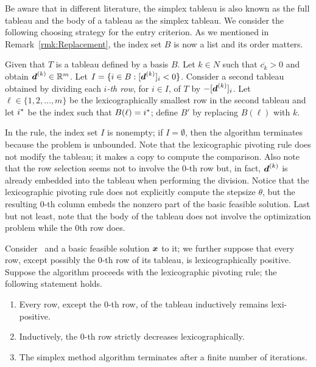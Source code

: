 Be aware that in different literature, the simplex tableau is also known as the full tableau and the body of a tableau as the simplex tableau. We consider the following choosing strategy for the entry criterion. As we mentioned in Remark~\ref{rmk:Replacement}, the index set $B$ is now a list and its order matters. 

\begin{definition}
Given that $T$ is a tableau defined by a basis $B$. Let $k\in N$ such that $\overline{c_k} > 0$ and obtain ${\boldsymbol d}^{(k)}\in\mathbb R^m$. Let $I = \{i\in B: [{\boldsymbol d}^{(k)}]_i < 0\}$. Consider a second tableau obtained by dividing each {\em $i$-th row}, for $i\in I$, of $T$ by $-[{\boldsymbol d}^{(k)}]_i$. Let $\ell \in \{1, 2, \dots, m\}$ be the lexicographically smallest row in the second tableau and let $i^\ast$ be the index such that $B(\ell) = i^\ast$; define $B'$ by replacing $B(\ell)$ with $k$. 
\end{definition}

In the rule, the index set $I$ is nonempty; if $I = \emptyset$, then the algorithm terminates because the problem is unbounded. Note that the lexicographic pivoting rule does not modify the tableau; it makes a copy to compute the comparison. Also note that the row selection seems not to involve the 0-th row but, in fact, ${\boldsymbol d}^{(k)}$ is already embedded into the tableau when performing the division. Notice that the lexicographic pivoting rule does not explicitly compute the stepsize $\theta$, but the resulting 0-th column embeds the nonzero part of the basic feasible solution. Last but not least, note that the body of the tableau does not involve the optimization problem while the 0th row does. 

\begin{theorem}\label{thm:lexico-monotonicity}
Consider \LPSA~and a basic feasible solution ${\boldsymbol x}$ to it; we further suppose that every row, except possibly the 0-th row of its tableau, is lexicographically positive. Suppose the algorithm proceeds with the lexicographic pivoting rule; the following statement holds. 
\begin{enumerate}
\item Every row, except the 0-th row, of the tableau inductively remains lexi-positive. 
\item Inductively, the 0-th row strictly decreases lexicographically. 
\item The simplex method algorithm terminates after a finite number of iterations. 
\end{enumerate}
\end{theorem}
 
